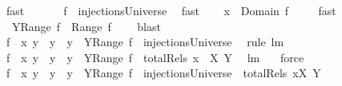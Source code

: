 \begin{isabellebody}
\ fast\ \isanewline
\ \ \isamarkupfalse%
\ \isamarkupfalse%
\ {\isachardoublequoteopen}f\ {\isasymin}\ injectionsUniverse{\isachardoublequoteclose}\ \isamarkupfalse%
\ fast\ \isamarkupfalse%
\ \isamarkupfalse%
\ {\isachardoublequoteopen}x\ {\isasymnotin}\ Domain\ f{\isachardoublequoteclose}\ \isamarkupfalse%
\ {}\ \isamarkupfalse%
\ fast\isanewline
\ \ \isamarkupfalse%
\ \isamarkupfalse%
\ {}{\isacharcolon}\ {\isachardoublequoteopen}{\isacharparenleft}Y{\isacharminus}Range\ f{\isacharparenright}\ {\isasyminter}\ Range\ f\ {\isacharequal}\ {\isacharbraceleft}{\isacharbraceright}{\isachardoublequoteclose}\ \isamarkupfalse%
\ blast\isanewline
\ \ \isamarkupfalse%
\ \isamarkupfalse%
\ {\isachardoublequoteopen}{\isacharbraceleft}f\ {\isasymunion}\ {\isacharbraceleft}{\isacharparenleft}x{\isacharcomma}\ y{\isacharparenright}{\isacharbraceright}\ {\isacharbar}\ y\ {\isachardot}\ y\ {\isasymin}\ {\isacharparenleft}Y{\isacharminus}Range\ f{\isacharparenright}{\isacharbraceright}\ {\isasymsubseteq}\ injectionsUniverse{\isachardoublequoteclose}\ \isamarkupfalse%
\ {\isacharparenleft}rule\ lm{}{}{\isacharparenright}\isanewline
\ \ \isamarkupfalse%
\ \isamarkupfalse%
\ {\isachardoublequoteopen}{\isacharbraceleft}f\ {\isasymunion}\ {\isacharbraceleft}{\isacharparenleft}x{\isacharcomma}\ y{\isacharparenright}{\isacharbraceright}\ {\isacharbar}\ y\ {\isachardot}\ y\ {\isasymin}\ {\isacharparenleft}Y{\isacharminus}Range\ f{\isacharparenright}{\isacharbraceright}\ {\isasymsubseteq}\ totalRels\ {\isacharparenleft}{\isacharbraceleft}x{\isacharbraceright}\ {\isasymunion}\ X{\isacharparenright}\ Y{\isachardoublequoteclose}\ \isamarkupfalse%
\ lm{}{}\ {}\ \isamarkupfalse%
\ force\isanewline
\ \ \isamarkupfalse%
\ \isamarkupfalse%
\ {\isachardoublequoteopen}{\isacharbraceleft}f\ {\isasymunion}\ {\isacharbraceleft}{\isacharparenleft}x{\isacharcomma}\ y{\isacharparenright}{\isacharbraceright}\ {\isacharbar}\ y\ {\isachardot}\ y\ {\isasymin}\ {\isacharparenleft}Y{\isacharminus}Range\ f{\isacharparenright}{\isacharbraceright}\ {\isasymsubseteq}\ injectionsUniverse\ {\isasyminter}\ totalRels\ {\isacharparenleft}{\isacharbraceleft}x{\isacharbraceright}{\isasymunion}X{\isacharparenright}\ Y{\isachardoublequoteclose}\ \isamarkupfalse%

\end{isabellebody}
